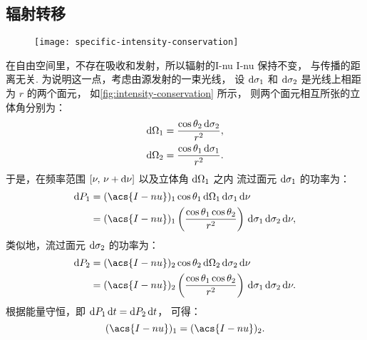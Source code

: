 \subsection{辐射转移}
\label{sec:radiative-transfer}

\begin{figure}[htp]
  \centering
  \texttt{[image: specific-intensity-conservation]}
  \label{fig:intensity-conservation}
\end{figure}

在自由空间里，不存在吸收和发射，所以辐射的\acl*{I-nu} \acs*{I-nu} 保持不变，
与传播的距离无关.
为说明这一点，考虑由源发射的一束光线，
设 $\mathrm{d}\sigma_1$ 和 $\mathrm{d}\sigma_2$ 是光线上相距为 $r$ 的两个面元，
如\autoref{fig:intensity-conservation} 所示，
则两个面元相互所张的立体角分别为：
\begin{align}
  \mathrm{d}\Omega_1 & = \frac{\cos\theta_2 \,\mathrm{d}\sigma_2}{r^2} , \\
  \mathrm{d}\Omega_2 & = \frac{\cos\theta_1 \,\mathrm{d}\sigma_1}{r^2} .
\end{align}
于是，在频率范围 $[\nu, \,\nu+\mathrm{d}\nu]$ 以及立体角 $\mathrm{d}\Omega_1$ 之内
流过面元 $\mathrm{d}\sigma_1$ 的功率为：
\begin{align}
  \D{P_1} & = (\acs{I-nu})_1 \cos\theta_1
      \,\D{\Omega_1} \,\D{\sigma_1} \,\D{\nu}  \\
    & = (\acs{I-nu})_1 \left( \frac{\cos\theta_1 \cos\theta_2}{r^2} \right)
      \,\D{\sigma_1} \,\D{\sigma_2} \,\D{\nu} ,
\end{align}
类似地，流过面元 $\mathrm{d}\sigma_2$ 的功率为：
\begin{align}
  \D{P_2} & = (\acs{I-nu})_2 \cos\theta_2
      \,\D{\Omega_2} \,\D{\sigma_2} \,\D{\nu}  \\
    & = (\acs{I-nu})_2 \left( \frac{\cos\theta_1 \cos\theta_2}{r^2} \right)
      \,\D{\sigma_1} \,\D{\sigma_2} \,\D{\nu} .
\end{align}
根据能量守恒，即 $\mathrm{d}P_1\,\mathrm{d}t = \mathrm{d}P_2\,\mathrm{d}t$，
可得：
\begin{equation}
  \label{eq:intensity-conservation}
  (\acs{I-nu})_1 = (\acs{I-nu})_2 .
\end{equation}

